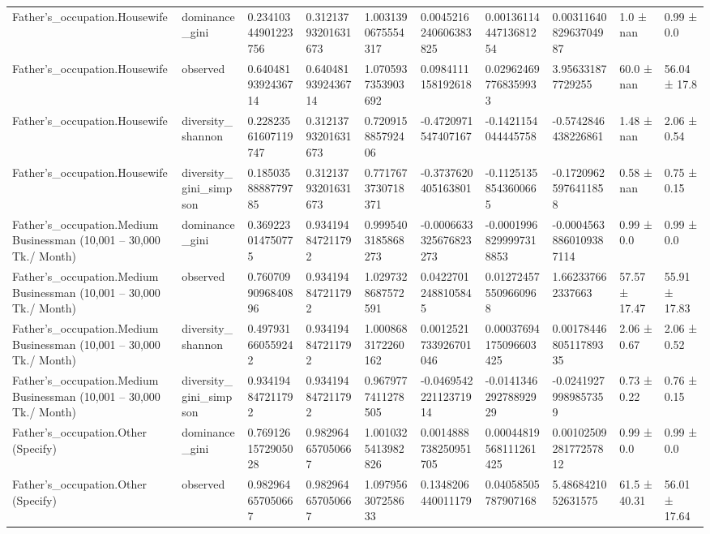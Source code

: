 \begin{longtable}{llllllllll}
Father’s\_occupation.Housewife & dominance\_gini & 0.23410344901223756 & 0.31213793201631673 & 1.0031390675554317 & 0.0045216240606383825 & 0.0013611444713681254 & 0.0031164082963704987 & 1.0 ± nan & 0.99 ± 0.0 \\
Father’s\_occupation.Housewife & observed & 0.6404819392436714 & 0.6404819392436714 & 1.0705937353903692 & 0.0984111158192618 & 0.029624697768359933 & 3.956331877729255 & 60.0 ± nan & 56.04 ± 17.8 \\
Father’s\_occupation.Housewife & diversity\_shannon & 0.22823561607119747 & 0.31213793201631673 & 0.720915885792406 & -0.4720971547407167 & -0.1421154044445758 & -0.5742846438226861 & 1.48 ± nan & 2.06 ± 0.54 \\
Father’s\_occupation.Housewife & diversity\_gini\_simpson & 0.1850358888779785 & 0.31213793201631673 & 0.7717673730718371 & -0.3737620405163801 & -0.11251358543600665 & -0.17209625976411858 & 0.58 ± nan & 0.75 ± 0.15 \\
Father’s\_occupation.Medium Businessman (10,001 – 30,000 Tk./ Month) & dominance\_gini & 0.369223014750775 & 0.934194847211792 & 0.9995403185868273 & -0.0006633325676823273 & -0.00019968299997318853 & -0.00045638860109387114 & 0.99 ± 0.0 & 0.99 ± 0.0 \\
Father’s\_occupation.Medium Businessman (10,001 – 30,000 Tk./ Month) & observed & 0.7607099096840896 & 0.934194847211792 & 1.0297328687572591 & 0.04227012488105845 & 0.012724575509660968 & 1.662337662337663 & 57.57 ± 17.47 & 55.91 ± 17.83 \\
Father’s\_occupation.Medium Businessman (10,001 – 30,000 Tk./ Month) & diversity\_shannon & 0.497931660559242 & 0.934194847211792 & 1.0008683172260162 & 0.0012521733926701046 & 0.00037694175096603425 & 0.0017844680511789335 & 2.06 ± 0.67 & 2.06 ± 0.52 \\
Father’s\_occupation.Medium Businessman (10,001 – 30,000 Tk./ Month) & diversity\_gini\_simpson & 0.934194847211792 & 0.934194847211792 & 0.9679777411278505 & -0.046954222112371914 & -0.014134629278892929 & -0.02419279989857359 & 0.73 ± 0.22 & 0.76 ± 0.15 \\
Father’s\_occupation.Other (Specify) & dominance\_gini & 0.7691261572905028 & 0.982964657050667 & 1.0010325413982826 & 0.0014888738250951705 & 0.00044819568111261425 & 0.0010250928177257812 & 0.99 ± 0.0 & 0.99 ± 0.0 \\
Father’s\_occupation.Other (Specify) & observed & 0.982964657050667 & 0.982964657050667 & 1.097956307258633 & 0.1348206440011179 & 0.04058505787907168 & 5.4868421052631575 & 61.5 ± 40.31 & 56.01 ± 17.64 \\

\end{longtable}

